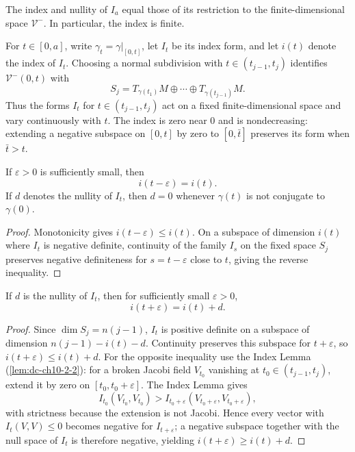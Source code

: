\begin{corollary}
  \label{cor:dc-ch11-2-6}
  The index and nullity of $I_a$ equal those of its restriction to the finite-dimensional
  space $\mathcal V^-$. In particular, the index is finite.
\end{corollary}

For $t\in[0,a]$, write $\gamma_t=\gamma|_{[0,t]}$, let $I_t$ be its index form,
and let $i(t)$ denote the index of $I_t$. Choosing a normal subdivision with
$t\in(t_{j-1},t_j)$ identifies $\mathcal V^-(0,t)$ with
\[
  S_j=T_{\gamma(t_1)}M\oplus\cdots\oplus T_{\gamma(t_{j-1})}M.
\]
Thus the forms $I_t$ for $t\in(t_{j-1},t_j)$ act on a fixed finite-dimensional
space and vary continuously with $t$. The index is zero near $0$ and is
nondecreasing: extending a negative subspace on $[0,t]$ by zero to $[0,\bar t]$
preserves its form when $\bar t>t$.

\begin{lemma}
  \label{lem:dc-ch11-2-7}
  If $\varepsilon>0$ is sufficiently small, then
  \[
    i(t-\varepsilon)=i(t).
  \]
  If $d$ denotes the nullity of $I_t$, then $d=0$ whenever $\gamma(t)$ is not
  conjugate to $\gamma(0)$.
\end{lemma}
\begin{proof}
  \sketch
  Monotonicity gives $i(t-\varepsilon)\leq i(t)$. On a subspace of dimension
  $i(t)$ where $I_t$ is negative definite, continuity of the family $I_s$ on the
  fixed space $S_j$ preserves negative definiteness for $s=t-\varepsilon$ close
  to $t$, giving the reverse inequality.
\end{proof}

\begin{lemma}
  \label{lem:dc-ch11-2-8}
  If $d$ is the nullity of $I_t$, then for sufficiently small $\varepsilon>0$,
  \[
    i(t+\varepsilon)=i(t)+d.
  \]
\end{lemma}
\begin{proof}
  \sketch
  Since $\dim S_j=n(j-1)$, $I_t$ is positive definite on a subspace of dimension
  $n(j-1)-i(t)-d$. Continuity preserves this subspace for $t+\varepsilon$, so
  $i(t+\varepsilon)\leq i(t)+d$. For the opposite inequality use the Index Lemma
  (\cref{lem:dc-ch10-2-2}): for a broken Jacobi field $V_{t_0}$ vanishing at
  $t_0\in(t_{j-1},t_j)$, extend it by zero on $[t_0,t_0+\varepsilon]$. The Index
  Lemma gives
  \[
    I_{t_0}(V_{t_0},V_{t_0})>
    I_{t_0+\varepsilon}(V_{t_0+\varepsilon},V_{t_0+\varepsilon}),
  \]
  with strictness because the extension is not Jacobi. Hence every vector with
  $I_t(V,V)\leq0$ becomes negative for $I_{t+\varepsilon}$; a negative subspace
  together with the null space of $I_t$ is therefore negative, yielding
  $i(t+\varepsilon)\geq i(t)+d$.
\end{proof}


